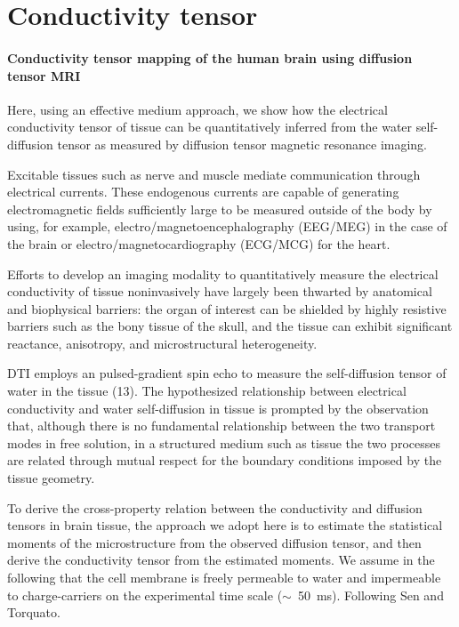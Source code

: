 \section{Conductivity tensor}

\paragraph{Conductivity tensor mapping of the human brain using diffusion tensor MRI~\cite{Tuch25092001}}{
Here, using an effective medium approach, we show how the electrical conductivity tensor of tissue can be quantitatively inferred from the water self-diffusion tensor as measured by diffusion tensor magnetic resonance imaging.

Excitable tissues such as nerve and muscle mediate communication through electrical currents. These endogenous currents are capable of generating electromagnetic fields sufficiently large to be measured outside of the body by using, for example, electro/magnetoencephalography (EEG/MEG) in the case of the brain or electro/magnetocardiography (ECG/MCG) for the heart.

Efforts to develop an imaging modality to quantitatively measure the electrical conductivity of tissue noninvasively have largely been thwarted by anatomical and biophysical barriers: the organ of interest can be shielded by highly resistive barriers such as the bony tissue of the skull, and the tissue can exhibit significant reactance, anisotropy, and microstructural heterogeneity.

DTI employs an pulsed-gradient spin echo to measure the self-diffusion tensor of water in the tissue (13). The hypothesized relationship between electrical conductivity and water self-diffusion in tissue is prompted by the observation that, although there is no fundamental relationship between the two transport modes in free solution, in a structured medium such as tissue the two processes are related through mutual respect for the boundary conditions imposed by the tissue geometry.

 To derive the cross-property relation between the conductivity and diffusion tensors in brain tissue, the approach we adopt here is to estimate the statistical moments of the microstructure from the observed diffusion tensor, and then derive the conductivity tensor from the estimated moments. We assume in the following that the cell membrane is freely permeable to water and impermeable to charge-carriers on the experimental time scale ($\sim$~50~ms). Following Sen and Torquato.
 
}
